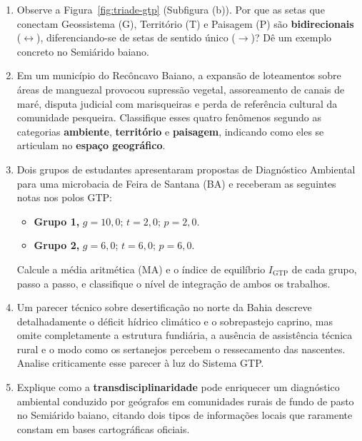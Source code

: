 \begin{enumerate}[leftmargin=1.8em, itemsep=4pt, resume]
  \item Observe a Figura~\ref{fig:triade-gtp} (Subfigura (b)). Por que as setas que conectam Geossistema (G), Território (T) e Paisagem (P) são \textbf{bidirecionais} ($\leftrightarrow$), diferenciando-se de setas de sentido único ($\rightarrow$)? Dê um exemplo concreto no Semiárido baiano.
  \espacoResolucao[2.3cm]

  \item Em um município do Recôncavo Baiano, a expansão de loteamentos sobre áreas de manguezal provocou supressão vegetal, assoreamento de canais de maré, disputa judicial com marisqueiras e perda de referência cultural da comunidade pesqueira. Classifique esses quatro fenômenos segundo as categorias \textbf{ambiente}, \textbf{território} e \textbf{paisagem}, indicando como eles se articulam no \textbf{espaço geográfico}.
  \espacoResolucao[2.5cm]

  \item Dois grupos de estudantes apresentaram propostas de Diagnóstico Ambiental para uma microbacia de Feira de Santana (BA) e receberam as seguintes notas nos polos GTP:
  \begin{itemize}[leftmargin=1.5em, itemsep=1pt]
    \item \textbf{Grupo 1,} $g = 10{,}0$; $t = 2{,}0$; $p = 2{,}0$.
    \item \textbf{Grupo 2,} $g = 6{,}0$; $t = 6{,}0$; $p = 6{,}0$.
  \end{itemize}
  Calcule a média aritmética ($\text{MA}$) e o índice de equilíbrio $I_{\text{GTP}}$ de cada grupo, passo a passo, e classifique o nível de integração de ambos os trabalhos.
  \espacoResolucao[2.8cm]

  \item Um parecer técnico sobre desertificação no norte da Bahia descreve detalhadamente o déficit hídrico climático e o sobrepastejo caprino, mas omite completamente a estrutura fundiária, a ausência de assistência técnica rural e o modo como os sertanejos percebem o ressecamento das nascentes. Analise criticamente esse parecer à luz do Sistema GTP.
  \espacoResolucao[2.3cm]

  \item Explique como a \textbf{transdisciplinaridade} pode enriquecer um diagnóstico ambiental conduzido por geógrafos em comunidades rurais de fundo de pasto no Semiárido baiano, citando dois tipos de informações locais que raramente constam em bases cartográficas oficiais.
  \espacoResolucao[2.3cm]
\end{enumerate}


